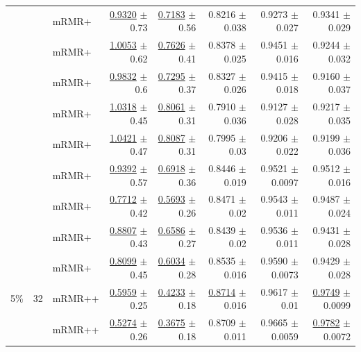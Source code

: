 \begin{longtable}{llp{}rrrrr}
 &  & mRMR+ & \underline{0.9320} {\scriptsize $\pm$ 0.73} & \underline{0.7183} {\scriptsize $\pm$ 0.56} & 0.8216 {\scriptsize $\pm$ 0.038} & 0.9273 {\scriptsize $\pm$ 0.027} & 0.9341 {\scriptsize $\pm$ 0.029} \\
 &  & mRMR+ & \underline{1.0053} {\scriptsize $\pm$ 0.62} & \underline{0.7626} {\scriptsize $\pm$ 0.41} & 0.8378 {\scriptsize $\pm$ 0.025} & 0.9451 {\scriptsize $\pm$ 0.016} & 0.9244 {\scriptsize $\pm$ 0.032} \\
 &  & mRMR+ & \underline{0.9832} {\scriptsize $\pm$ 0.6} & \underline{0.7295} {\scriptsize $\pm$ 0.37} & 0.8327 {\scriptsize $\pm$ 0.026} & 0.9415 {\scriptsize $\pm$ 0.018} & 0.9160 {\scriptsize $\pm$ 0.037} \\
 &  & mRMR+ & \underline{1.0318} {\scriptsize $\pm$ 0.45} & \underline{0.8061} {\scriptsize $\pm$ 0.31} & 0.7910 {\scriptsize $\pm$ 0.036} & 0.9127 {\scriptsize $\pm$ 0.028} & 0.9217 {\scriptsize $\pm$ 0.035} \\
 &  & mRMR+ & \underline{1.0421} {\scriptsize $\pm$ 0.47} & \underline{0.8087} {\scriptsize $\pm$ 0.31} & 0.7995 {\scriptsize $\pm$ 0.03} & 0.9206 {\scriptsize $\pm$ 0.022} & 0.9199 {\scriptsize $\pm$ 0.036} \\
 &  & mRMR+ & \underline{0.9392} {\scriptsize $\pm$ 0.57} & \underline{0.6918} {\scriptsize $\pm$ 0.36} & 0.8446 {\scriptsize $\pm$ 0.019} & 0.9521 {\scriptsize $\pm$ 0.0097} & 0.9512 {\scriptsize $\pm$ 0.016} \\
 &  & mRMR+ & \underline{0.7712} {\scriptsize $\pm$ 0.42} & \underline{0.5693} {\scriptsize $\pm$ 0.26} & 0.8471 {\scriptsize $\pm$ 0.02} & 0.9543 {\scriptsize $\pm$ 0.011} & 0.9487 {\scriptsize $\pm$ 0.024} \\
 &  & mRMR+ & \underline{0.8807} {\scriptsize $\pm$ 0.43} & \underline{0.6586} {\scriptsize $\pm$ 0.27} & 0.8439 {\scriptsize $\pm$ 0.02} & 0.9536 {\scriptsize $\pm$ 0.011} & 0.9431 {\scriptsize $\pm$ 0.028} \\
 &  & mRMR+ & \underline{0.8099} {\scriptsize $\pm$ 0.45} & \underline{0.6034} {\scriptsize $\pm$ 0.28} & 0.8535 {\scriptsize $\pm$ 0.016} & 0.9590 {\scriptsize $\pm$ 0.0073} & 0.9429 {\scriptsize $\pm$ 0.028} \\
\midrule
5\% & 32 & mRMR++ & \underline{0.5959} {\scriptsize $\pm$ 0.25} & \underline{0.4233} {\scriptsize $\pm$ 0.18} & \underline{0.8714} {\scriptsize $\pm$ 0.016} & 0.9617 {\scriptsize $\pm$ 0.01} & \underline{0.9749} {\scriptsize $\pm$ 0.0099} \\
 &  & mRMR++ & \underline{0.5274} {\scriptsize $\pm$ 0.26} & \underline{0.3675} {\scriptsize $\pm$ 0.18} & 0.8709 {\scriptsize $\pm$ 0.011} & 0.9665 {\scriptsize $\pm$ 0.0059} & \underline{0.9782} {\scriptsize $\pm$ 0.0072} \\

\end{longtable}
